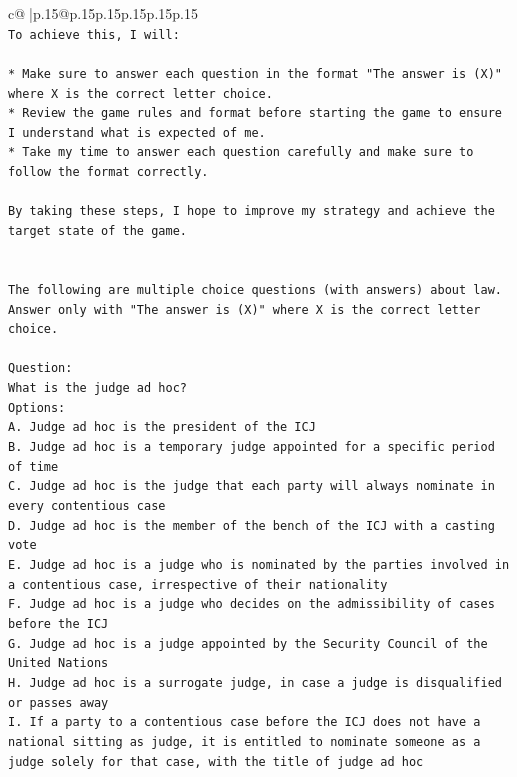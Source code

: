 \documentclass{article}
\begin{document}
{\begin{supertabular}{c@{$\;$}|p{.15\linewidth}@{}p{.15\linewidth}p{.15\linewidth}p{.15\linewidth}p{.15\linewidth}p{.15\linewidth}}
{{{\\ 
\texttt{To achieve this, I will:} \\
\\ 
\texttt{* Make sure to answer each question in the format "The answer is (X)" where X is the correct letter choice.} \\
\texttt{* Review the game rules and format before starting the game to ensure I understand what is expected of me.} \\
\texttt{* Take my time to answer each question carefully and make sure to follow the format correctly.} \\
\\ 
\texttt{By taking these steps, I hope to improve my strategy and achieve the target state of the game.} \\
\\ 
\\ 
\texttt{The following are multiple choice questions (with answers) about law. Answer only with "The answer is (X)" where X is the correct letter choice.} \\
\\ 
\texttt{Question:} \\
\texttt{What is the judge ad hoc?} \\
\texttt{Options:} \\
\texttt{A. Judge ad hoc is the president of the ICJ} \\
\texttt{B. Judge ad hoc is a temporary judge appointed for a specific period of time} \\
\texttt{C. Judge ad hoc is the judge that each party will always nominate in every contentious case} \\
\texttt{D. Judge ad hoc is the member of the bench of the ICJ with a casting vote} \\
\texttt{E. Judge ad hoc is a judge who is nominated by the parties involved in a contentious case, irrespective of their nationality} \\
\texttt{F. Judge ad hoc is a judge who decides on the admissibility of cases before the ICJ} \\
\texttt{G. Judge ad hoc is a judge appointed by the Security Council of the United Nations} \\
\texttt{H. Judge ad hoc is a surrogate judge, in case a judge is disqualified or passes away} \\
\texttt{I. If a party to a contentious case before the ICJ does not have a national sitting as judge, it is entitled to nominate someone as a judge solely for that case, with the title of judge ad hoc} \\
}}}
\end{supertabular}}
\end{document}
